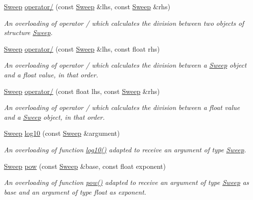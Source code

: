 \begin{DoxyCompactItemize}
\hyperlink{structSweep}{Sweep} \hyperlink{structSweep_a3e230f15cb1119940203a1a452676b74}{operator/} (const \hyperlink{structSweep}{Sweep} \&lhs, const \hyperlink{structSweep}{Sweep} \&rhs)
\begin{DoxyCompactList}\small\item\em An overloading of operator / which calculates the division between two objects of structure {\itshape \hyperlink{structSweep}{Sweep}}. \end{DoxyCompactList}\item 
\hyperlink{structSweep}{Sweep} \hyperlink{structSweep_a73694ded6e7ba41c367ca5f0934cbc2c}{operator/} (const \hyperlink{structSweep}{Sweep} \&lhs, const float rhs)
\begin{DoxyCompactList}\small\item\em An overloading of operator / which calculates the division between a {\itshape \hyperlink{structSweep}{Sweep}} object and a {\itshape float} value, in that order. \end{DoxyCompactList}\item 
\hyperlink{structSweep}{Sweep} \hyperlink{structSweep_abe3c133bf246f7faebcfda286c5e1448}{operator/} (const float lhs, const \hyperlink{structSweep}{Sweep} \&rhs)
\begin{DoxyCompactList}\small\item\em An overloading of operator / which calculates the division between a {\itshape float} value and a {\itshape \hyperlink{structSweep}{Sweep}} object, in that order. \end{DoxyCompactList}\item 
\hyperlink{structSweep}{Sweep} \hyperlink{structSweep_a37df38f37b1cf6a6bfb18f44b706d308}{log10} (const \hyperlink{structSweep}{Sweep} \&argument)
\begin{DoxyCompactList}\small\item\em An overloading of function {\ttfamily \hyperlink{structSweep_a37df38f37b1cf6a6bfb18f44b706d308}{log10()}} adapted to receive an argument of type {\itshape \hyperlink{structSweep}{Sweep}}. \end{DoxyCompactList}\item 
\hyperlink{structSweep}{Sweep} \hyperlink{structSweep_a09ee88cfc9b28e6ec344eea1a2817ea9}{pow} (const \hyperlink{structSweep}{Sweep} \&base, const float exponent)
\begin{DoxyCompactList}\small\item\em An overloading of function {\ttfamily \hyperlink{structSweep_a09ee88cfc9b28e6ec344eea1a2817ea9}{pow()}} adapted to receive an argument of type {\itshape \hyperlink{structSweep}{Sweep}} as base and an argument of type {\itshape float} as exponent. \end{DoxyCompactList}\item 

\end{DoxyCompactItemize}
